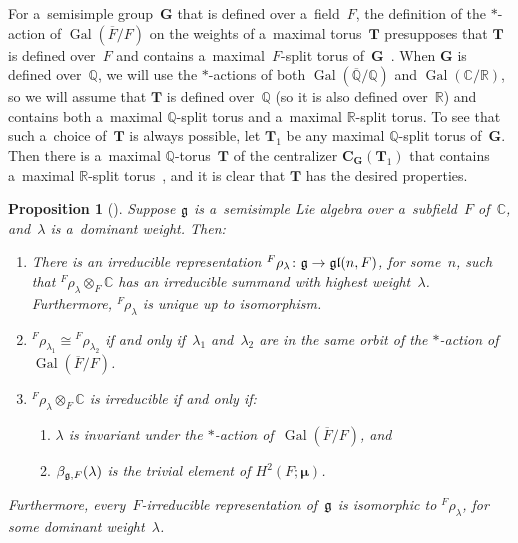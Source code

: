 \documentclass[10pt,a4paper]{amsart}
\DeclareMathOperator{\Gal}{Gal}
\numberwithin{equation}{section}
\newtheorem{prop}{Proposition}[section]
\newcommand{\Lie}[1]{\mathfrak{\lowercase{#1}}}
\begin{document}
\begin{rem}
For a~semisimple group~$\mathbf{G}$ that is def\/ined over a~f\/ield~$F$, the def\/inition of the $*$-action of
$\Gal(\overline{F}/F)$ on the weights of a~maximal torus~$\mathbf{T}$ presupposes that $\mathbf{T}$ is def\/ined over~$F$
and contains a~maximal~$F$-split torus of~$\mathbf{G}$~\cite[p.~66]{PlatonovRapinchukBook}.
When $\mathbf{G}$ is def\/ined over~$\mathbb{Q}$, we will use the $*$-actions of both $\Gal(\overline{\mathbb{Q}}/\mathbb{Q})$ and $\Gal(\mathbb{C}/\mathbb{R})$, so we will assume that $\mathbf{T}$ is def\/ined
over~$\mathbb{Q}$ (so it is also def\/ined over~$\mathbb{R}$) and contains both a~maximal $\mathbb{Q}$-split torus and
a~maximal $\mathbb{R}$-split torus.
To see that such a~choice of~$\mathbf{T}$ is always possible, let $\mathbf{T}_1$ be any maximal $\mathbb{Q}$-split torus
of~$\mathbf{G}$.
Then there is a~maximal $\mathbb{Q}$-torus~$\mathbf{T}$ of the centralizer $\mathbf{C}_{\mathbf{G}}(\mathbf{T}_1)$ that
contains a~maximal $\mathbb{R}$-split torus~\cite[Corollary~2 of Proposition~7.8, p.~418]{PlatonovRapinchukBook}, and it is clear
that $\mathbf{T}$ has the desired properties.
\end{rem}

\begin{prop}[]\label{HighWt}
Suppose $\Lie G$ is a~semisimple Lie algebra over a~subfield~$F$ of~$\mathbb{C}$, and~$\lambda$ is a~dominant weight.
Then:
\renewcommand{\labelenumi}{{\rm \theenumi.}}
\begin{enumerate}\itemsep=0pt
\item There is an irreducible representation ${}^F \rho_\lambda \colon \Lie G \to \Lie{GL}(n, F)$, for some~$n$, such
that \mbox{${}^F \rho_\lambda \otimes_F \mathbb{C}$} has an irreducible summand with highest weight~$\lambda$.
Furthermore, ${}^F \rho_\lambda$ is unique up to isomorphism.

\item ${}^F \rho_{\lambda_1} \cong {}^F \rho_{\lambda_2}$ if and only if~$\lambda_1$ and~$\lambda_2$ are in the same
orbit of the $*$-action of~$\Gal(\overline{F}/F)$.

\item
\label{HighWt-IrredIff}
${}^F \rho_\lambda \otimes_F \mathbb{C}$ is irreducible if and only if:
\begin{enumerate}[{\rm (a)}]\itemsep=0pt
\item
$\lambda$ is invariant under the $*$-action of~$\Gal(\overline{F}/F)$, and
\item
$\beta_{\Lie G,F}(\lambda)$ is the trivial element of $H^2(F; \boldsymbol\mu)$.
\end{enumerate}
\end{enumerate}
Furthermore, every~$F$-irreducible representation of~$\Lie G$ is isomorphic to ${}^F \rho_{\lambda}$, for some
dominant weight~$\lambda$.
\end{prop}
\end{document}
